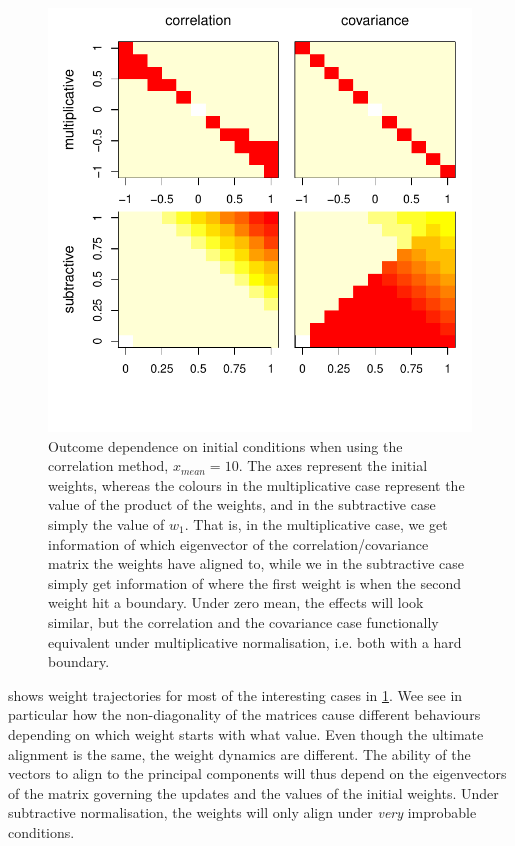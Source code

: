 \documentclass[10pt]{article}\usepackage[]{graphicx}\usepackage[]{color}
\makeatletter
\def\maxwidth{ %
  \ifdim\Gin@nat@width>\linewidth
    \linewidth
  \else
    \Gin@nat@width
  \fi
}
\theoremstyle{plain}
\makeatother
\begin{document}
\begin{multicols*}{2}
\begin{Schunk}
\begin{figure}[H]
{\centering \includegraphics[width=\maxwidth]{../figures/twocolumn-3_initialconditions_mean10-1} 

}

\caption[Outcome dependence on initial conditions when using the correlation method, $x_{mean} = 10$]{Outcome dependence on initial conditions when using the correlation method, $x_{mean} = 10$. The axes represent the initial weights, whereas the colours in the multiplicative case represent the value of the product of the weights, and in the subtractive case simply the value of $w_1$. That is, in the multiplicative case, we get information of which eigenvector of the correlation/covariance matrix the weights have aligned to, while we in the subtractive case simply get information of where the first weight is when the second weight hit a boundary. Under zero mean, the effects will look similar, but the correlation and the covariance case functionally equivalent under multiplicative normalisation, i.e. both with a hard boundary.}\label{fig:3_initialconditions_mean10}
\end{figure}
\end{Schunk}

 shows weight trajectories for most of the interesting cases in \cref{fig:3_initialconditions_mean10}. Wee see in particular how the non-diagonality of the matrices cause different behaviours depending on which weight starts with what value. Even though the ultimate alignment is the same, the weight dynamics are different. The ability of the vectors to align to the principal components will thus depend on the eigenvectors of the matrix governing the updates and the values of the initial weights. Under subtractive normalisation, the weights will only align under \textit{very} improbable conditions. 


\end{multicols*}
\end{document}
